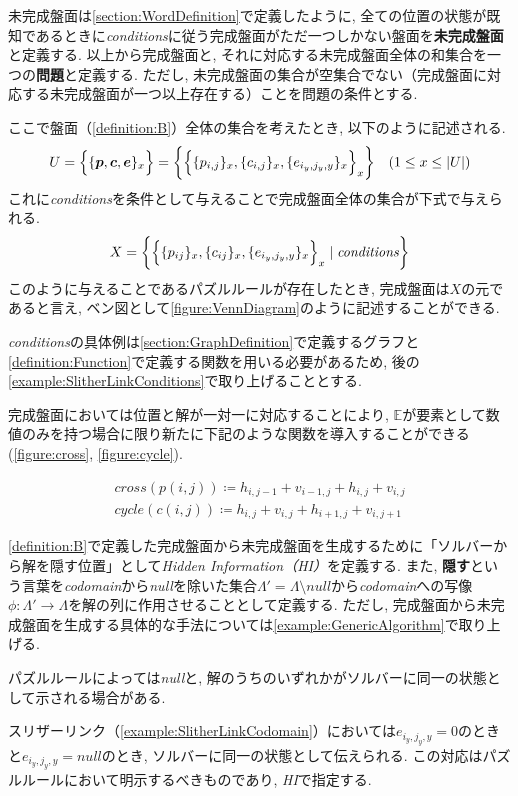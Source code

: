 未完成盤面は\cref{section:WordDefinition}で定義したように, 全ての位置の状態が既知であるときに\textit{conditions}に従う完成盤面がただ一つしかない盤面を\textbf{未完成盤面}と定義する.
以上から完成盤面と, それに対応する未完成盤面全体の和集合を一つの\textbf{問題}と定義する. ただし, 未完成盤面の集合が空集合でない（完成盤面に対応する未完成盤面が一つ以上存在する）ことを問題の条件とする.

ここで盤面（\cref{definition:B}）全体の集合を考えたとき, 以下のように記述される.
\begin{equation}\label{equation:U}
  U=\Bigl\{\{\bm{p},\bm{c},\bm{e}\}_x\Bigr\}=\biggl\{\Bigl\{\{p_{i,j}\}_x,\{c_{i,j}\}_x,\{e_{i_y,j_y,y}\}_x\Bigr\}_x\biggr\} \quad (1\le x \le |U|)
\end{equation}
これに\textit{conditions}を条件として与えることで完成盤面全体の集合が下式で与えられる.
\begin{equation}\label{equation:X}
  X=\biggl\{\Bigl\{\{p_{ij}\}_x,\{c_{ij}\}_x,\{e_{i_y,j_y,y}\}_x\Bigr\}_x\mid \rm{\textit{conditions}}\biggr\}
\end{equation}
このように与えることであるパズルルールが存在したとき, 完成盤面は$X$の元であると言え, ベン図として\cref{figure:VennDiagram}のように記述することができる.

\textit{conditions}の具体例は\cref{section:GraphDefinition}で定義するグラフと\cref{definition:Function}で定義する関数を用いる必要があるため, 後の\cref{example:SlitherLinkConditions}で取り上げることとする.

完成盤面においては位置と解が一対一に対応することにより, $\mathbb{E}$が要素として数値のみを持つ場合に限り新たに下記のような関数を導入することができる(\cref{figure:cross}, \cref{figure:cycle}).

\begin{definition}\label{definition:Function}
  \begin{align}
    \textit{cross}(p(i,j))\coloneqq h_{i,j-1}+v_{i-1,j}+h_{i,j}+v_{i,j} \\
    \textit{cycle}(c(i,j))\coloneqq h_{i,j}+v_{i,j}+h_{i+1,j}+v_{i,j+1}
  \end{align}
\end{definition}


\cref{definition:B}で定義した完成盤面から未完成盤面を生成するために「ソルバーから解を隠す位置」として\textit{Hidden Information（HI）}を定義する.
また, \textbf{隠す}という言葉を\textit{codomain}から\textit{null}を除いた集合$\Lambda'=\Lambda \setminus \textit{null}$から\textit{codomain}への写像$\phi\colon \Lambda' \longrightarrow \Lambda$を解の列に作用させることとして定義する. ただし, 完成盤面から未完成盤面を生成する具体的な手法については\cref{example:GenericAlgorithm}で取り上げる.
\begin{remark}\label{remark:Null}
  パズルルールによっては\textit{null}と, 解のうちのいずれかがソルバーに同一の状態として示される場合がある.
\end{remark}
スリザーリンク（\cref{example:SlitherLinkCodomain}）においては$e_{i_y,j_y,y} = 0$のときと$e_{i_y,j_y,y}=\textit{null}$のとき, ソルバーに同一の状態として伝えられる. この対応はパズルルールにおいて明示するべきものであり, \textit{HI}で指定する.


